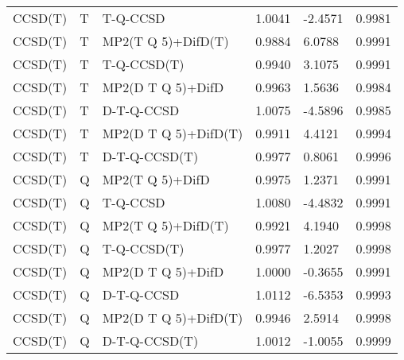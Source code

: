 \begin{table}
\begin{tabular}{l l l l l l }
    CCSD(T) & T & T-Q-CCSD & 1.0041 & -2.4571 & 0.9981 \\ 
    CCSD(T) & T & MP2(T Q 5)+DifD(T) & 0.9884 & 6.0788 & 0.9991 \\ 
    CCSD(T) & T & T-Q-CCSD(T) & 0.9940 & 3.1075 & 0.9991 \\ 
    CCSD(T) & T & MP2(D T Q 5)+DifD & 0.9963 & 1.5636 & 0.9984 \\ 
    CCSD(T) & T & D-T-Q-CCSD & 1.0075 & -4.5896 & 0.9985 \\ 
    CCSD(T) & T & MP2(D T Q 5)+DifD(T) & 0.9911 & 4.4121 & 0.9994 \\ 
    CCSD(T) & T & D-T-Q-CCSD(T) & 0.9977 & 0.8061 & 0.9996 \\ 
    CCSD(T) & Q & MP2(T Q 5)+DifD & 0.9975 & 1.2371 & 0.9991 \\ 
    CCSD(T) & Q & T-Q-CCSD & 1.0080 & -4.4832 & 0.9991 \\ 
    CCSD(T) & Q & MP2(T Q 5)+DifD(T) & 0.9921 & 4.1940 & 0.9998 \\ 
    CCSD(T) & Q & T-Q-CCSD(T) & 0.9977 & 1.2027 & 0.9998 \\ 
    CCSD(T) & Q & MP2(D T Q 5)+DifD & 1.0000 & -0.3655 & 0.9991 \\ 
    CCSD(T) & Q & D-T-Q-CCSD & 1.0112 & -6.5353 & 0.9993 \\ 
    CCSD(T) & Q & MP2(D T Q 5)+DifD(T) & 0.9946 & 2.5914 & 0.9998 \\ 
    CCSD(T) & Q & D-T-Q-CCSD(T) & 1.0012 & -1.0055 & 0.9999 \\ 
    \hline
  \end{tabular}
\end{table}
